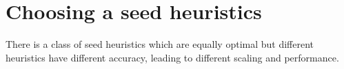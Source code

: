\section{Choosing a seed heuristics}

There is a class of seed heuristics which are equally optimal but different
heuristics have different accuracy, leading to different \A scaling and
performance.